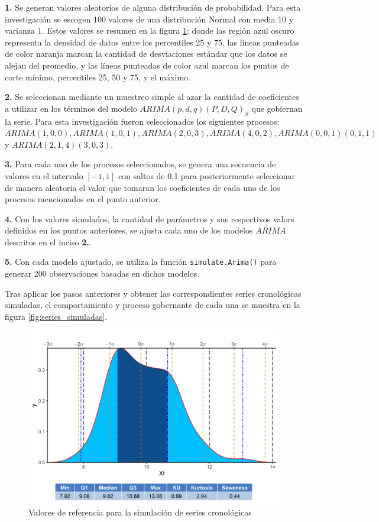 \documentclass[
]{article}
\begin{document}
\textbf{1.} Se generan valores aleatorios de alguna distribución de
probabilidad. Para esta investigación se escogen 100 valores de una
distribución Normal con media 10 y varianza 1. Estos valores se resumen
en la figura \ref{fig:datos_simulados}; donde las región azul oscuro
representa la densidad de datos entre los percentiles 25 y 75, las
líneas punteadas de color naranja marcan la cantidad de desviaciones
estándar que los datos se alejan del promedio, y las líneas punteadas de
color azul marcan los puntos de corte mínimo, percentiles 25, 50 y 75, y
el máximo.

\textbf{2.} Se seleccionan mediante un muestreo simple al azar la
cantidad de coeficientes a utilizar en los términos del modelo
\(ARIMA(p,d,q)(P,D,Q)_S\) que gobiernan la serie. Para esta
investigación fueron seleccionados los siguientes procesos:
\(ARIMA(1,0,0), ARIMA(1,0,1),ARIMA(2,0,3), ARIMA(4,0,2), ARIMA(0,0,1)(0,1,1)\)
y \(ARIMA(2,1,4)(3,0,3)\).

\textbf{3.} Para cada uno de los procesos seleccionados, se genera una
secuencia de valores en el intervalo \([-1,1]\) con saltos de 0.1 para
posteriormente seleccionar de manera aleatoria el valor que tomaran los
coeficientes de cada uno de los procesos mencionados en el punto
anterior.

\textbf{4.} Con los valores simulados, la cantidad de parámetros y sus
respectivos valors definidos en los puntos anteriores, se ajusta cada
uno de los modelos \(ARIMA\) descritos en el inciso \textbf{2.}.

\textbf{5.} Con cada modelo ajustado, se utiliza la función
\texttt{simulate.Arima()} para generar 200 observaciones basadas en
dichos modelos.

Tras aplicar los pasos anteriores y obtener las correspondientes series
cronológicas simuladas, el comportamiento y proceso gobernante de cada
una se muestra en la figura \ref{fig:series_simuladas}.

\begin{figure}[!h]
\includegraphics[width=1\linewidth,height=1\textheight]{Tesis_files/figure-latex/datos_simulados-1} \caption{Valores de referencia para la simulación de series cronológicas}\label{fig:datos_simulados}
\end{figure}
\end{document}
